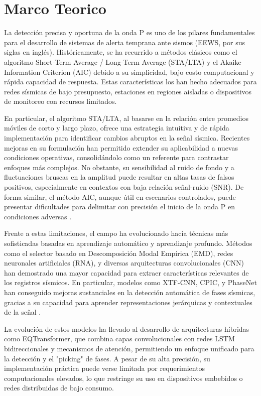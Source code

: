 \chapter{Marco Teorico}

La detección precisa y oportuna de la onda P es uno de los pilares fundamentales para el desarrollo de sistemas de alerta temprana ante sismos (EEWS, por sus siglas en inglés). Históricamente, se ha recurrido a métodos clásicos como el algoritmo Short-Term Average / Long-Term Average (STA/LTA) y el Akaike Information Criterion (AIC) debido a su simplicidad, bajo costo computacional y rápida capacidad de respuesta. Estas características los han hecho adecuados para redes sísmicas de bajo presupuesto, estaciones en regiones aisladas o dispositivos de monitoreo con recursos limitados.

En particular, el algoritmo STA/LTA, al basarse en la relación entre promedios móviles de corto y largo plazo, ofrece una estrategia intuitiva y de rápida implementación para identificar cambios abruptos en la señal sísmica. Recientes mejoras en su formulación han permitido extender su aplicabilidad a nuevas condiciones operativas, consolidándolo como un referente para contrastar enfoques más complejos. No obstante, su sensibilidad al ruido de fondo y a fluctuaciones bruscas en la amplitud puede resultar en altas tasas de falsos positivos, especialmente en contextos con baja relación señal-ruido (SNR). De forma similar, el método AIC, aunque útil en escenarios controlados, puede presentar dificultades para delimitar con precisión el inicio de la onda P en condiciones adversas \cite{kalkan2016automatic, shang2018enhancing}.

Frente a estas limitaciones, el campo ha evolucionado hacia técnicas más sofisticadas basadas en aprendizaje automático y aprendizaje profundo. Métodos como el selector basado en Descomposición Modal Empírica (EMD), redes neuronales artificiales (RNA), y diversas arquitecturas convolucionales (CNN) han demostrado una mayor capacidad para extraer características relevantes de los registros sísmicos. En particular, modelos como XTF-CNN, CPIC, y PhaseNet han conseguido mejoras sustanciales en la detección automática de fases sísmicas, gracias a su capacidad para aprender representaciones jerárquicas y contextuales de la señal \cite{zhu2019deep, bi2021explainable}.

La evolución de estos modelos ha llevado al desarrollo de arquitecturas híbridas como EQTransformer, que combina capas convolucionales con redes LSTM bidireccionales y mecanismos de atención, permitiendo un enfoque unificado para la detección y el "picking" de fases. A pesar de su alta precisión, su implementación práctica puede verse limitada por requerimientos computacionales elevados, lo que restringe su uso en dispositivos embebidos o redes distribuidas de bajo consumo.

